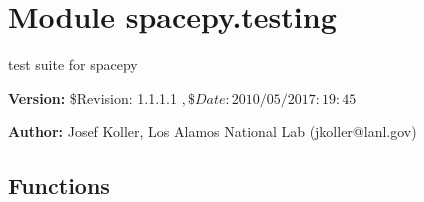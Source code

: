 %
%
%


\section{Module spacepy.testing}

    \label{spacepy:testing}
test suite for spacepy

\textbf{Version:} \$Revision: 1.1.1.1 $, \$Date: 2010/05/20 17:19:45 $



\textbf{Author:} Josef Koller, Los Alamos National Lab (jkoller@lanl.gov)





  \subsection{Functions}

    \label{spacepy:testing:all}

    \vspace{0.5ex}

